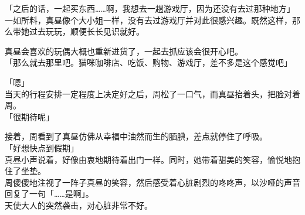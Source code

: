 「之后的话，一起买东西……啊，我想去一趟游戏厅，因为还没有去过那种地方」\\

一如所料，真昼像个大小姐一样，没有去过游戏厅并对此很感兴趣。既然这样，那么带她过去玩玩，顺便长长见识就好。

真昼会喜欢的玩偶大概也重新进货了，一起去抓应该会很开心吧。\\

「那么就去那里吧。猫咪咖啡店、吃饭、购物、游戏厅，差不多是这个感觉吧」

「嗯」\\

当天的行程安排一定程度上决定好之后，周松了一口气，而真昼抬着头，把脸对着周。\\

「很期待呢」

接着，周看到了真昼仿佛从幸福中油然而生的腼腆，差点就停住了呼吸。\\

「好想快点到假期」\\

真昼小声说着，好像由衷地期待着出门一样。同时，她带着甜美的笑容，愉悦地抱住了坐垫。\\

周傻傻地注视了一阵子真昼的笑容，然后感受着心脏剧烈的咚咚声，以沙哑的声音回复了一句「……是啊」。\\

天使大人的突然袭击，对心脏非常不好。
